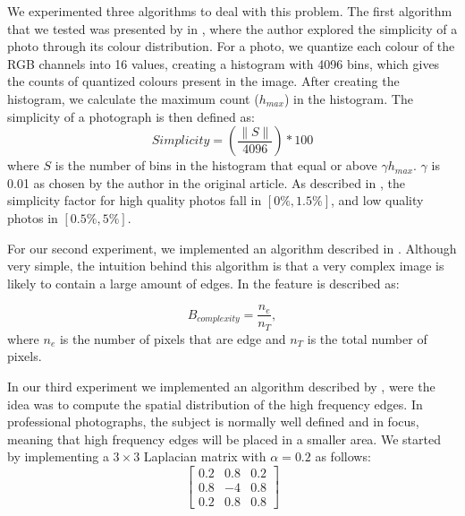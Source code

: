 We experimented three algorithms to deal with this problem. The first algorithm that we tested was presented by \citeauthor{luo2008photo} in \cite{luo2008photo}, where the author explored the simplicity of a photo through its colour distribution. For a photo, we quantize each colour of the RGB channels into 16 values, creating a histogram with 4096 bins, which gives the counts of quantized colours present in the image. After creating the histogram, we calculate the maximum count ($h_{max}$) in the histogram. The simplicity of a photograph is then defined as:
\begin{equation}
	Simplicity = \left(\frac{\|S\|}{4096}\right) * 100%
\end{equation}
where $S$ is the number of bins in the histogram that equal or above $\gamma h_{max}$. $\gamma$ is 0.01 as chosen by the author in the original article. As described in \cite{luo2008photo}, the simplicity factor for high quality photos fall in $[0\%,1.5\%]$, and low quality photos in $[0.5\%,5\%]$.


For our second experiment, we implemented an algorithm described in \cite{kaoautomatic}. Although very simple, the intuition behind this algorithm is that a very complex image is likely to contain a large amount of edges. In \cite{kaoautomatic} the feature is described as:

\begin{equation}
	B_{complexity} = \frac{n_{e}}{n_{T}},
\end{equation}
where $n_{e}$ is the number of pixels that are edge and $n_{T}$ is the total number of pixels.
 

In our third experiment we implemented an algorithm described by \citeauthor{ke2006design} \cite{ke2006design}, were the idea was to compute the spatial distribution of the high frequency edges. In professional photographs, the subject is normally well defined and in focus, meaning that high frequency edges will be placed in a smaller area.
We started by implementing a $3\times3$ Laplacian matrix with $\alpha = 0.2$ as follows:
\begin{equation}
\begin{bmatrix}
  0.2 & 0.8 & 0.2 \\
  0.8 & -4 & 0.8 \\
  0.2 & 0.8 & 0.8
\end{bmatrix}
\end{equation}

